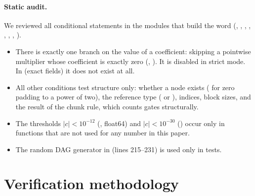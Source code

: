\documentclass[11pt]{article}
\theoremstyle{plain}
\newcommand{\abs}[1]{\lvert #1\rvert}
\begin{document}
\paragraph{Static audit.}
We reviewed all conditional statements in the modules that build the word (, , , , , , , ).
\begin{itemize}
\item There is exactly one branch on the value of a coefficient: skipping a pointwise multiplier whose coefficient is exactly zero (, ). It is disabled in strict mode. In  (exact fields) it does not exist at all.
\item All other conditions test structure only: whether a node exists ( for zero padding to a power of two), the reference type ( or ), indices, block sizes, and the result of the chunk rule, which counts gates structurally.
\item The thresholds $\abs{c}<10^{-12}$ (, float64) and $\abs{c}<10^{-30}$ () occur only in functions that are not used for any number in this paper.
\item The random DAG generator in  (lines 215--231) is used only in tests.
\end{itemize}

\section{Verification methodology}\label{sec:method}
\end{document}
